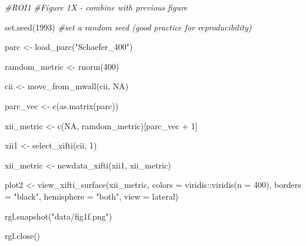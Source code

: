 \documentclass{article}
\newenvironment{Shaded}{\begin{snugshade}}{\end{snugshade}}
\newcommand{\AttributeTok}[1]{\textcolor[rgb]{0.77,0.63,0.00}{#1}}
\newcommand{\CommentTok}[1]{\textcolor[rgb]{0.56,0.35,0.01}{\textit{#1}}}
\newcommand{\ConstantTok}[1]{\textcolor[rgb]{0.00,0.00,0.00}{#1}}
\newcommand{\DecValTok}[1]{\textcolor[rgb]{0.00,0.00,0.81}{#1}}
\newcommand{\FunctionTok}[1]{\textcolor[rgb]{0.00,0.00,0.00}{#1}}
\newcommand{\NormalTok}[1]{#1}
\newcommand{\OtherTok}[1]{\textcolor[rgb]{0.56,0.35,0.01}{#1}}
\newcommand{\SpecialCharTok}[1]{\textcolor[rgb]{0.00,0.00,0.00}{#1}}
\newcommand{\StringTok}[1]{\textcolor[rgb]{0.31,0.60,0.02}{#1}}
\begin{document}
\begin{Shaded}
\begin{Highlighting}[]
\CommentTok{\#ROI1 }
\CommentTok{\#Figure 1X {-} combine with previous figure}

\FunctionTok{set.seed}\NormalTok{(}\DecValTok{1993}\NormalTok{) }\CommentTok{\#set a random seed (good practice for reproducibility)}

\NormalTok{parc }\OtherTok{\textless{}{-}} \FunctionTok{load\_parc}\NormalTok{(}\StringTok{"Schaefer\_400"}\NormalTok{)}

\NormalTok{ramdom\_metric }\OtherTok{\textless{}{-}} \FunctionTok{rnorm}\NormalTok{(}\DecValTok{400}\NormalTok{)}

\NormalTok{cii }\OtherTok{\textless{}{-}} \FunctionTok{move\_from\_mwall}\NormalTok{(cii, }\ConstantTok{NA}\NormalTok{)}

\NormalTok{parc\_vec }\OtherTok{\textless{}{-}} \FunctionTok{c}\NormalTok{(}\FunctionTok{as.matrix}\NormalTok{(parc))}

\NormalTok{xii\_metric }\OtherTok{\textless{}{-}} \FunctionTok{c}\NormalTok{(}\ConstantTok{NA}\NormalTok{, ramdom\_metric)[parc\_vec }\SpecialCharTok{+} \DecValTok{1}\NormalTok{]}

\NormalTok{xii1 }\OtherTok{\textless{}{-}} \FunctionTok{select\_xifti}\NormalTok{(cii, }\DecValTok{1}\NormalTok{)}

\NormalTok{xii\_metric }\OtherTok{\textless{}{-}} \FunctionTok{newdata\_xifti}\NormalTok{(xii1, xii\_metric)}

\NormalTok{plot2 }\OtherTok{\textless{}{-}} \FunctionTok{view\_xifti\_surface}\NormalTok{(xii\_metric, }
                            \AttributeTok{colors =}\NormalTok{ viridis}\SpecialCharTok{::}\FunctionTok{viridis}\NormalTok{(}\AttributeTok{n =} \DecValTok{400}\NormalTok{), }
                            \AttributeTok{borders =} \StringTok{"black"}\NormalTok{, }
                            \AttributeTok{hemisphere =} \StringTok{"both"}\NormalTok{,}
                            \AttributeTok{view =} \StringTok{\textquotesingle{}lateral\textquotesingle{}}\NormalTok{)}

\FunctionTok{rgl.snapshot}\NormalTok{(}\StringTok{"data/fig1f.png"}\NormalTok{)}

\FunctionTok{rgl.close}\NormalTok{()}
\end{Highlighting}
\end{Shaded}
\end{document}
